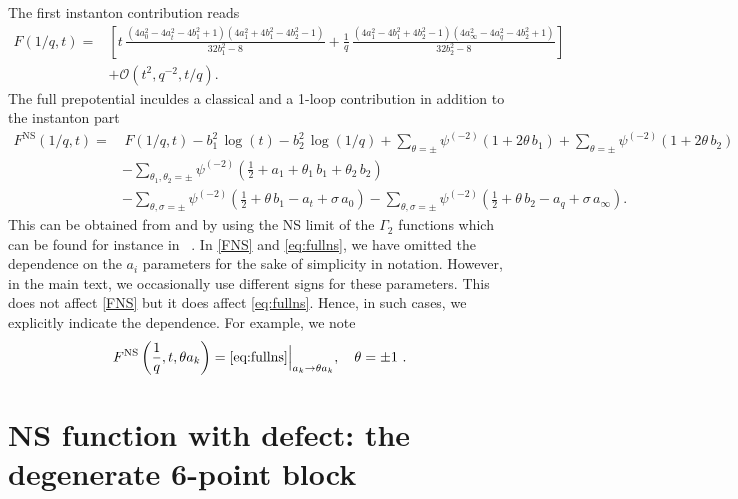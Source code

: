 \documentclass[11pt]{article}
\numberwithin{equation}{section}
\newcommand{\be}{\begin{equation}}
\newcommand{\ee}{\end{equation}}
\begin{document}
%
The first instanton contribution reads
\begin{equation}
\begin{aligned}
F(1/q,t)=&\left[t\,\frac{\left(4a_0^2-4a_t^2-4b_1^2+1\right) \left(4a_1^2+4b_1^2-4b_2^2-1\right)}{32b_1^2-8}+\frac{1}{q}\,\frac{\left(4a_1^2-4b_1^2+4b_2^2-1\right) \left(4a_{\infty}^2-4a_{q}^2-4b_2^2+1\right)}{32b_2^2-8}\right]\\
&+\mathcal{O}(t^2, q^{-2},t/q).
\end{aligned}
\end{equation}
The full prepotential inculdes a classical and a 1-loop contribution in addition to the instanton part 
\begin{equation}
\begin{aligned}\label{eq:fullns}
F^{\text{NS}}(1/q,t)=&\,F(1/q,t)-b_1^2\,\log(t)-b_2^2\,\log(1/q)+\sum_{\theta=\pm}\psi^{(-2)}(1+2\theta\,b_1)+\sum_{\theta=\pm}\psi^{(-2)}(1+2\theta\,b_2)\\
&-\sum_{\theta_1,\theta_2=\pm}\psi^{(-2)}\left(\frac{1}{2}+a_1+\theta_1\,b_1+\theta_2\,b_2\right)\\
&-\sum_{\theta,\sigma=\pm}\psi^{(-2)}\left(\frac{1}{2}+\theta\,b_1-a_t+\sigma\,a_0\right)-\sum_{\theta,\sigma=\pm}\psi^{(-2)}\left(\frac{1}{2}+\theta\,b_2-a_q+\sigma\,a_{\infty}\right).
\end{aligned}
\end{equation}
This can be obtained from \cite[App.~B]{Alday:2009aq} and by using the NS limit of the $\Gamma_2$ functions which can be found for instance in \cite[(A.30)-(A.31)]{Jeong:2018qpc}~.
In \eqref{FNS} and \eqref{eq:fullns}, we have omitted the dependence on the $a_i$ parameters for the sake of simplicity in notation. However, in the main text, we occasionally use different signs for these parameters. This does not affect \eqref{FNS} but it does affect \eqref{eq:fullns}.
Hence, in such cases, we explicitly indicate the dependence. For example, we note
\be \label{eq:fnsconv}F^{\rm NS}\left({1\over q},t, \theta a_k\right)=\text{\eqref{eq:fullns}}\Big|_{a_k\to \theta a_k}, \quad \theta=\pm 1~.\ee



\section{NS function with defect: the degenerate 6-point block}\label{appendix5+1}
\end{document}
